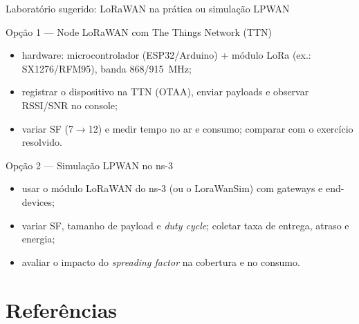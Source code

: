 \documentclass[aspectratio=169,11pt]{beamer}
\begin{document}
\begin{frame}{Laboratório sugerido: LoRaWAN na prática ou simulação LPWAN}
  \begin{block}{Opção 1 --- Node LoRaWAN com The Things Network (TTN)}
    \begin{itemize}
      \item hardware: microcontrolador (ESP32/Arduino) + módulo LoRa (ex.: SX1276/RFM95), banda 868/915~MHz;
      \item registrar o dispositivo na TTN (OTAA), enviar payloads e observar RSSI/SNR no console;
      \item variar SF (7$\rightarrow$12) e medir tempo no ar e consumo; comparar com o exercício resolvido.
    \end{itemize}
  \end{block}
  \pause
  \begin{block}{Opção 2 --- Simulação LPWAN no ns-3}
    \begin{itemize}
      \item usar o módulo LoRaWAN do ns-3 (ou o LoraWanSim) com gateways e end-devices;
      \item variar SF, tamanho de payload e \emph{duty cycle}; coletar taxa de entrega, atraso e energia;
      \item avaliar o impacto do \emph{spreading factor} na cobertura e no consumo.
    \end{itemize}
  \end{block}
\end{frame}

\section{Referências}
\end{document}
